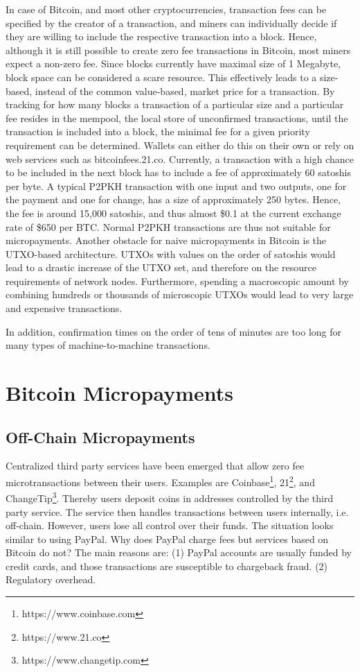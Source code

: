 In case of Bitcoin, and most other cryptocurrencies, transaction fees can be specified by the creator of a transaction, and miners can individually decide if they are willing to include the respective transaction into a block. Hence, although it is still possible to create zero fee transactions in Bitcoin, most miners expect a non-zero fee. Since blocks currently have maximal size of 1 Megabyte, block space can be considered a scare resource. This effectively leads to a size-based, instead of the common value-based, market price for a transaction. By tracking for how many blocks a transaction of a particular size and a particular fee resides in the mempool, the local store of unconfirmed transactions, until the transaction is included into a block, the minimal fee for a given priority requirement can be determined. Wallets can either do this on their own or rely on web services such as bitcoinfees.21.co. 
Currently, a transaction with a high chance to be included in the next block has to include a fee of approximately 60 satoshis per byte. A typical P2PKH transaction with one input and two outputs, one for the payment and one for change, has a size of approximately 250 bytes. Hence, the fee is around 15,000 satoshis, and thus almost \$0.1 at the current exchange rate of \$650 per BTC. 
Normal P2PKH transactions are thus not suitable for micropayments. Another obstacle for naive micropayments in Bitcoin is the UTXO-based architecture. UTXOs with values on the order of satoshis would lead to a drastic increase of the UTXO set, and therefore on the resource requirements of network nodes. Furthermore, spending a macroscopic amount by combining hundreds or thousands of microscopic UTXOs would lead to very large and expensive transactions. 

In addition, confirmation times on the order of tens of minutes are too long for many types of  machine-to-machine transactions.

\section{Bitcoin Micropayments}

\subsection{Off-Chain Micropayments}

Centralized third party services have been emerged that allow zero fee microtransactions between their users. Examples are Coinbase\footnote{https://www.coinbase.com}, 21\footnote{https://www.21.co}, and ChangeTip\footnote{https://www.changetip.com}. Thereby users deposit coins in addresses controlled by the third party service. The service then handles transactions between users internally, i.e. off-chain. However, users lose all control over their funds. The situation looks similar to using PayPal. Why does PayPal charge fees but services based on Bitcoin do not? The main reasons are: (1) PayPal accounts are usually funded by credit cards, and those transactions are susceptible to chargeback fraud. (2) Regulatory overhead. 

